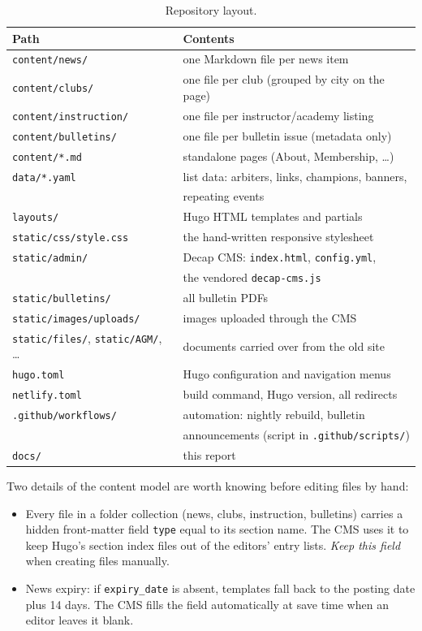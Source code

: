 \documentclass[12pt,letterpaper]{article}
\begin{document}
\begin{table}[h]
\centering
\small
\begin{tabular}{@{}ll@{}}
\toprule
\textbf{Path} & \textbf{Contents} \\
\midrule
\texttt{content/news/} & one Markdown file per news item \\
\texttt{content/clubs/} & one file per club (grouped by city on the page) \\
\texttt{content/instruction/} & one file per instructor/academy listing \\
\texttt{content/bulletins/} & one file per bulletin issue (metadata only) \\
\texttt{content/*.md} & standalone pages (About, Membership, \ldots) \\
\texttt{data/*.yaml} & list data: arbiters, links, champions, banners, \\
 & \quad repeating events \\
\texttt{layouts/} & Hugo HTML templates and partials \\
\texttt{static/css/style.css} & the hand-written responsive stylesheet \\
\texttt{static/admin/} & Decap CMS: \texttt{index.html}, \texttt{config.yml}, \\
 & \quad the vendored \texttt{decap-cms.js} \\
\texttt{static/bulletins/} & all bulletin PDFs \\
\texttt{static/images/uploads/} & images uploaded through the CMS \\
\texttt{static/files/}, \texttt{static/AGM/}, \ldots & documents carried over from the old site \\
\texttt{hugo.toml} & Hugo configuration and navigation menus \\
\texttt{netlify.toml} & build command, Hugo version, all redirects \\
\texttt{.github/workflows/} & automation: nightly rebuild, bulletin \\
 & \quad announcements (script in \texttt{.github/scripts/}) \\
\texttt{docs/} & this report \\
\bottomrule
\end{tabular}
\caption{Repository layout.}
\label{tab:repo}
\end{table}

Two details of the content model are worth knowing before editing files by
hand:

\begin{itemize}
  \item Every file in a folder collection (news, clubs, instruction,
  bulletins) carries a hidden front-matter field \texttt{type} equal to its
  section name. The CMS uses it to keep Hugo's section index files out of
  the editors' entry lists. \emph{Keep this field} when creating files
  manually.
  \item News expiry: if \texttt{expiry\_date} is absent, templates fall
  back to the posting date plus 14 days. The CMS fills the field
  automatically at save time when an editor leaves it blank.
\end{itemize}
\end{document}

